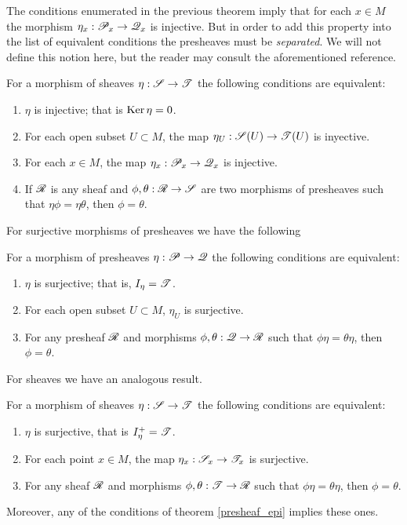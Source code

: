 \begin{obs}
The conditions enumerated in the previous theorem imply that for each $x\in M$ the morphism $\eta_x:\mathscr{P}_x\to \mathscr{Q}_x$ is injective. But in order to add this property into the list of equivalent conditions the presheaves must be \emph{separated}. We will not define this notion here, but the reader may consult the aforementioned reference.
\end{obs}

\begin{theorem}
For a morphism of sheaves $\eta :\mathscr{S}\to \mathscr{T}$ the following conditions are equivalent:
\begin{enumerate}
\item $\eta$ is injective; that is $\operatorname{Ker}\eta =0$.
\item For each open subset $U\subset M$, the map $\eta_U:\mathscr{S}(U)\to \mathscr{T}(U)$ is inyective.
\item For each $x\in M$, the map $\eta_x:\mathscr{P}_x\to \mathscr{Q}_x$ is injective.
\item If $\mathscr{R}$ is any sheaf and $\phi ,\theta :\mathscr{R}\to \mathscr{S}$ are two morphisms of presheaves such that $\eta \phi =\eta \theta$, then $\phi =\theta$.
\end{enumerate}
\end{theorem}

For surjective morphisms of presheaves we have the following

\begin{theorem}\label{presheaf_epi}
For a morphism of presheaves $\eta :\mathscr{P}\to \mathscr{Q}$ the following conditions are equivalent:
\begin{enumerate}
\item $\eta$ is surjective; that is, $I_{\eta}=\mathscr{T}$. 
\item For each open subset $U\subset M$, $\eta_U$ is surjective.
\item For any presheaf $\mathscr{R}$ and morphisms $\phi ,\theta :\mathscr{Q}\to \mathscr{R}$ such that $\phi \eta =\theta \eta$, then $\phi =\theta$.
\end{enumerate}
\end{theorem}

For sheaves we have an analogous result.

\begin{theorem}
For a morphism of sheaves $\eta :\mathscr{S}\to \mathscr{T}$ the following conditions are equivalent:
\begin{enumerate}
\item $\eta$ is surjective, that is $I^+_{\eta }=\mathscr{T}$.
\item For each point $x\in M$, the map $\eta_x:\mathscr{S}_x\to \mathscr{T}_x$ is surjective.
\item For any sheaf $\mathscr{R}$ and morphisms $\phi ,\theta :\mathscr{T}\to \mathscr{R}$ such that $\phi \eta =\theta \eta$, then $\phi =\theta$.
\end{enumerate}
Moreover, any of the conditions of theorem \ref{presheaf_epi} implies these ones.
\end{theorem}

